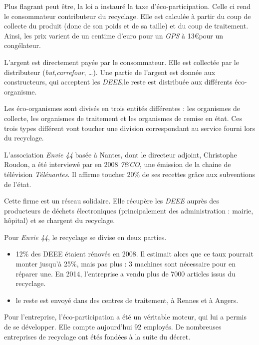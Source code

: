 Plus flagrant peut être, la loi a instauré la taxe d'éco-participation. Celle ci rend le consommateur contributeur du recyclage. Elle est calculée à partir du coup de collecte du produit (donc de son poids et de sa taille) et du coup de traitement. Ainsi, les prix varient de un centime d'euro pour un \textit{GPS} à 13\euro pour un congélateur. 

L'argent est directement payée par le consommateur. Elle est collectée par le distributeur (\textit{but},\textit{carrefour}, \dots). Une partie de l'argent est donnée aux constructeurs, qui acceptent les \textit{DEEE},le reste est distribuée aux différents éco-organisme. 

Les éco-organismes sont divisés en trois entités différentes : les organismes de collecte, les organismes de traitement et les organismes de remise en état. Ces trois types différent vont toucher une division correspondant au service fourni lors du recyclage. 

\medbreak

L'association \textit{Envie 44} basée à Nantes, dont le directeur adjoint, Christophe Roudon, a été interviewé par en 2008 \textit{7\&CO}, une émission de la chaine de télévision \textit{Télénantes}. Il affirme toucher 20\% de ses recettes grâce aux subventions de l'état. 

Cette firme est un réseau solidaire. Elle récupère les \textit{DEEE} auprès des producteurs de déchets électroniques (principalement des administration : mairie, hôpital) et se chargent du recyclage. 

Pour \textit{Envie 44}, le recyclage se divise en deux parties. 
\begin{itemize}
\item 12\% des DEEE étaient rénovés en 2008. Il estimait alors que ce taux pourrait monter jusqu'à 25\%, mais pas plus : 3 machines sont nécessaire pour en réparer une. En 2014, l'entreprise a vendu plus de 7000 articles issus du recyclage. 
\item le reste est envoyé dans des centres de traitement, à Rennes et à Angers.
\end{itemize}

Pour l'entreprise, l'éco-participation a été un véritable moteur, qui lui a permis de se développer. Elle compte aujourd'hui 92 employés. De nombreuses entreprises de recyclage ont étés fondées à la suite du décret. 